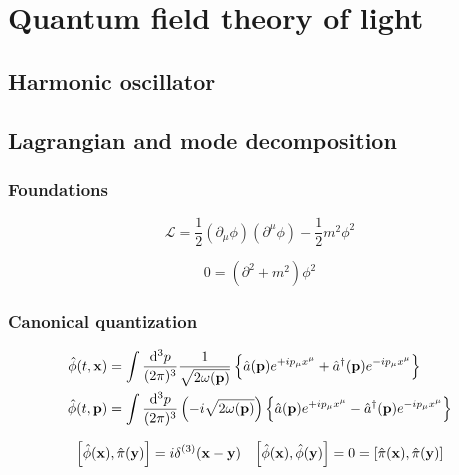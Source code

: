 \chapter{Quantum field theory of light}

\section{Harmonic oscillator}

\section{Lagrangian and mode decomposition}

\subsection{Foundations}

\begin{equation}
	\mathcal{L}
	=
	\frac{1}{2}
	\left(\partial_\mu\phi\right)
	\left(\partial^\mu\phi\right)
	-
	\frac{1}{2}
	m^2\phi^2
	\label{eq:kg_lagrangian}
\end{equation}

\begin{equation}
	0
	=
	\left(\partial^2+m^2\right)
	\phi^2
	\label{eq:kg_eom}
\end{equation}

\subsection{Canonical quantization}

\begin{align}
	\hat\phi(t,\vb{x})
	&=
	\int\frac{\dd[3]{p}}{(2\pi)^3}
	\frac{1}{\sqrt{2\omega(\vb{p})}}
	\left\{
		\hat{a}(\vb{p})
		e^{+ip_\mu x^\mu}
		+
		\hat{a}^\dagger(\vb{p})
		e^{-ip_\mu x^\mu}
	\right\}
	\label{eq:kg_pos}
	\\
	\hat\phi(t,\vb{p})
	&=
	\int\frac{\dd[3]{p}}{(2\pi)^3}
	\left(-i\sqrt{2\omega(\vb{p})}\right)
	\left\{
		\hat{a}(\vb{p})
		e^{+ip_\mu x^\mu}
		-
		\hat{a}^\dagger(\vb{p})
		e^{-ip_\mu x^\mu}
	\right\}
	\label{eq:kg_mom}
\end{align}

\begin{align}
	\comm{\hat\phi(\vb{x})}{\hat\pi(\vb{y})}
	=
	i\delta^{(3)}(\vb{x}-\vb{y})
	&&
	\comm{\hat\phi(\vb{x})}{\hat\phi(\vb{y})}
	=
	0
	=
	\comm{\hat\pi(\vb{x})}{\hat\pi(\vb{y})}
	\label{eq:kg_comm_pm}
\end{align}

